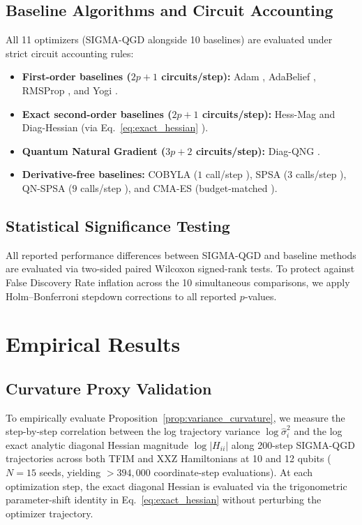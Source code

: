 \documentclass[11pt,a4paper]{article}
\begin{document}
\subsection{Baseline Algorithms and Circuit Accounting}
All 11 optimizers (SIGMA-QGD alongside 10 baselines) are evaluated under strict circuit accounting rules:
\begin{itemize}
    \item \textbf{First-order baselines ($2p+1$ circuits/step):} Adam \cite{kingma2014adam}, AdaBelief \cite{zhuang2020adabelief}, RMSProp \cite{tieleman2012lecture}, and Yogi \cite{zaheer2018adaptive}.
    \item \textbf{Exact second-order baselines ($2p+1$ circuits/step):} Hess-Mag and Diag-Hessian (via Eq.~\eqref{eq:exact_hessian} \cite{wierichs2022general}).
    \item \textbf{Quantum Natural Gradient ($3p+2$ circuits/step):} Diag-QNG \cite{stokes2020quantum,wierichs2020avoiding}.
    \item \textbf{Derivative-free baselines:} COBYLA ($1$ call/step \cite{powell1994direct}), SPSA ($3$ calls/step \cite{spall1992multivariate,spall1997accelerated,spall1998implementation,spall2000adaptive}), QN-SPSA ($9$ calls/step \cite{gacon2021simultaneous}), and CMA-ES (budget-matched \cite{novak2025benchmarking}).
\end{itemize}

\subsection{Statistical Significance Testing}
All reported performance differences between SIGMA-QGD and baseline methods are evaluated via two-sided paired Wilcoxon signed-rank tests. To protect against False Discovery Rate inflation across the 10 simultaneous comparisons, we apply Holm--Bonferroni stepdown corrections to all reported $p$-values.

\section{Empirical Results}
\label{sec:results}

\subsection{Curvature Proxy Validation}
\label{sec:exp_proxy}
To empirically evaluate Proposition~\ref{prop:variance_curvature}, we measure the step-by-step correlation between the log trajectory variance $\log \hat{\sigma}_i^2$ and the log exact analytic diagonal Hessian magnitude $\log |H_{ii}|$ along 200-step SIGMA-QGD trajectories across both TFIM and XXZ Hamiltonians at 10 and 12 qubits ($N=15$ seeds, yielding $>394{,}000$ coordinate-step evaluations). At each optimization step, the exact diagonal Hessian is evaluated via the trigonometric parameter-shift identity in Eq.~\eqref{eq:exact_hessian} without perturbing the optimizer trajectory.
\end{document}
